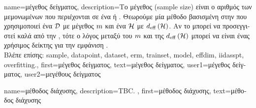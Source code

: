 {name={\foreignlanguage{greek}{μέγεθος δείγματος}},
	description={\foreignlanguage{greek}{Το μέγεθος}  (sample size) 
		\foreignlanguage{greek}{είναι ο αριθμός των μεμονωμένων}  \foreignlanguage{greek}{που περιέχονται σε ένα}  
	    	 \foreignlanguage{greek}{ή} . \foreignlanguage{greek}{Θεωρούμε μία μέθοδο βασισμένη 
		στην}  \foreignlanguage{greek}{που χρησιμοποιεί ένα}  $\mathcal{D}$ 
		\foreignlanguage{greek}{με μέγεθος}  $m$ \foreignlanguage{greek}{και ένα}
		 $\mathcal{H}$ \foreignlanguage{greek}{με}  $d_{\rm eff} \left( \mathcal{H} \right)$. 
		\foreignlanguage{greek}{Αν το}  \foreignlanguage{greek}{μπορεί να προσεγγιστεί καλά από την} 
		, \foreignlanguage{greek}{τότε ο λόγος μεταξύ του $m$ και της $d_{\rm eff} \left( \mathcal{H} \right)$ 
		μπορεί να είναι ένας χρήσιμος δείκτης για την εμφάνιση}  \cite[\foreignlanguage{greek}{Κεφ.} 6]{MLBasics}.
		\\
		\foreignlanguage{greek}{Βλέπε επίσης:} \gls{sample}, \gls{datapoint}, \gls{dataset}, \gls{erm}, \gls{trainset}, \gls{model}, \gls{effdim},
		\gls{iidasspt}, \gls{overfitting}.},
	first={\foreignlanguage{greek}{μέγεθος δείγματος}},
	text={\foreignlanguage{greek}{μέγεθος δείγματος}},
	user1={\foreignlanguage{greek}{μέγεθος δείγματος}}, %
	user2={\foreignlanguage{greek}{μεγέθους δείγματος}} %
}

{name={\foreignlanguage{greek}{μέθοδος διάχυσης}},
	description={TBC. },
	first={\foreignlanguage{greek}{μέθοδος διάχυσης}},
    	text={\foreignlanguage{greek}{μέθοδος διάχυσης}}
}

